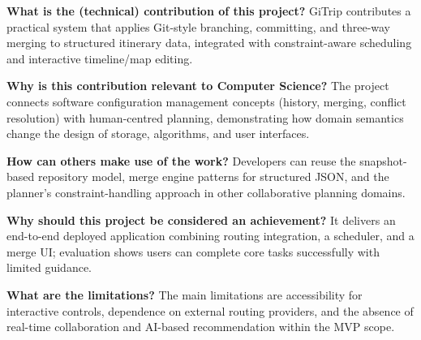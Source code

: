 \textbf{What is the (technical) contribution of this project?} GiTrip contributes
a practical system that applies Git-style branching, committing, and three-way
merging to structured itinerary data, integrated with constraint-aware scheduling
and interactive timeline/map editing.

\textbf{Why is this contribution relevant to Computer Science?} The project
connects software configuration management concepts (history, merging, conflict
resolution) with human-centred planning, demonstrating how domain semantics
change the design of storage, algorithms, and user interfaces.

\textbf{How can others make use of the work?} Developers can reuse the
snapshot-based repository model, merge engine patterns for structured JSON, and
the planner's constraint-handling approach in other collaborative planning
domains.

\textbf{Why should this project be considered an achievement?} It delivers an
end-to-end deployed application combining routing integration, a scheduler, and a
merge UI; evaluation shows users can complete core tasks successfully with limited
guidance.

\textbf{What are the limitations?} The main limitations are accessibility for interactive controls, dependence on external routing providers, and the absence of real-time collaboration and AI-based recommendation within the MVP scope.
